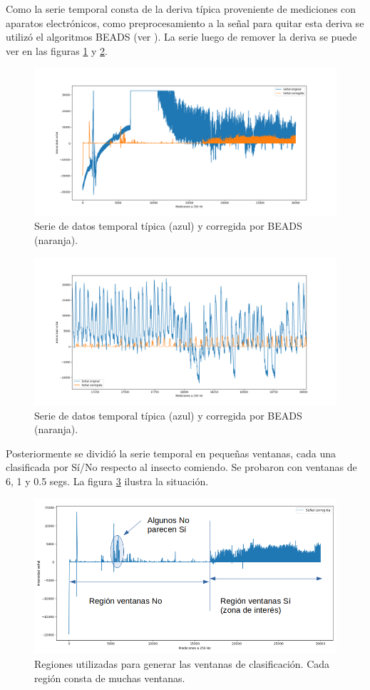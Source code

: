\documentclass[a4paper,twocolumn]{article}
\begin{document}
Como la serie temporal consta de la deriva típica proveniente de mediciones con aparatos electrónicos, como preprocesamiento a la señal para quitar esta deriva se utilizó el algoritmos BEADS (ver \cite{beads}). La serie luego de remover la deriva se puede ver en las figuras \ref{serieBeads} y \ref{serieBeads2}.

\begin{figure}[ht]
	\includegraphics[trim={3cm 1cm 3cm 1cm}, clip,width=.5\textwidth]{./senial.png}
	\caption{Serie de datos temporal típica (azul) y corregida por BEADS (naranja).}
	\label{serieBeads}
\end{figure}
\begin{figure}[ht]
	\includegraphics[trim={3cm 1cm 3cm 1cm}, clip,width=.5\textwidth]{./senial2.png}
	\caption{Serie de datos temporal típica (azul) y corregida por BEADS (naranja).}
	\label{serieBeads2}
\end{figure}

Posteriormente se dividió la serie temporal en pequeñas ventanas, cada una clasificada por Sí/No respecto al insecto comiendo. Se probaron con ventanas de 6, 1 y 0.5 segs. La figura \ref{serieVentanas} ilustra la situación.
\begin{figure}[h]
	\includegraphics[trim={0cm 0cm 0cm 0cm}, clip,width=.5\textwidth]{./separacionVentanasBien.png}
	\caption{Regiones utilizadas para generar las ventanas de clasificación. Cada región consta de muchas ventanas.}
	\label{serieVentanas}
\end{figure}
\end{document}
